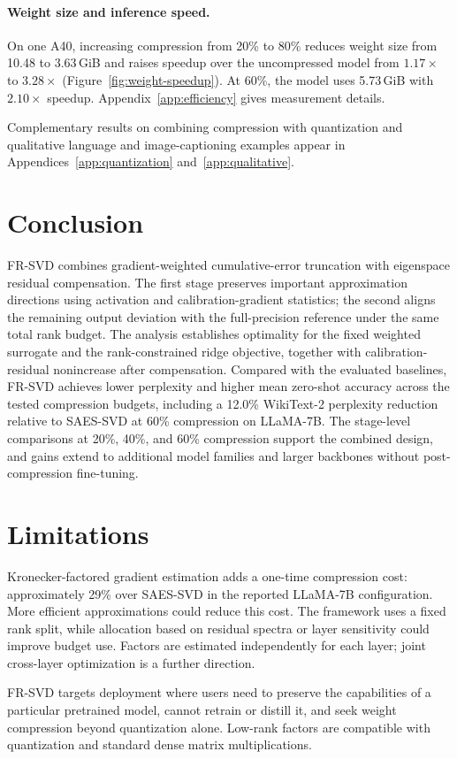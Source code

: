 \documentclass[11pt]{article}
\begin{document}


\paragraph{Weight size and inference speed.}
On one A40, increasing compression from 20\% to 80\% reduces weight size from 10.48 to 3.63\,GiB and raises speedup over the uncompressed model from $1.17\times$ to $3.28\times$ (Figure~\ref{fig:weight-speedup}). At 60\%, the model uses 5.73\,GiB with $2.10\times$ speedup. Appendix~\ref{app:efficiency} gives measurement details.



Complementary results on combining compression with quantization and qualitative language and image-captioning examples appear in Appendices~\ref{app:quantization} and~\ref{app:qualitative}.

\section{Conclusion}\label{sec:conclusion}

FR-SVD combines gradient-weighted cumulative-error truncation with eigenspace residual compensation. The first stage preserves important approximation directions using activation and calibration-gradient statistics; the second aligns the remaining output deviation with the full-precision reference under the same total rank budget. The analysis establishes optimality for the fixed weighted surrogate and the rank-constrained ridge objective, together with calibration-residual nonincrease after compensation. Compared with the evaluated baselines, FR-SVD achieves lower perplexity and higher mean zero-shot accuracy across the tested compression budgets, including a 12.0\% WikiText-2 perplexity reduction relative to SAES-SVD at 60\% compression on LLaMA-7B. The stage-level comparisons at 20\%, 40\%, and 60\% compression support the combined design, and gains extend to additional model families and larger backbones without post-compression fine-tuning.
\FloatBarrier
\label{main:end}

\section*{Limitations}

Kronecker-factored gradient estimation adds a one-time compression cost: approximately 29\% over SAES-SVD in the reported LLaMA-7B configuration. More efficient approximations could reduce this cost. The framework uses a fixed rank split, while allocation based on residual spectra or layer sensitivity could improve budget use. Factors are estimated independently for each layer; joint cross-layer optimization is a further direction.

FR-SVD targets deployment where users need to preserve the capabilities of a particular pretrained model, cannot retrain or distill it, and seek weight compression beyond quantization alone. Low-rank factors are compatible with quantization and standard dense matrix multiplications.


\clearpage
\appendix

\end{document}
